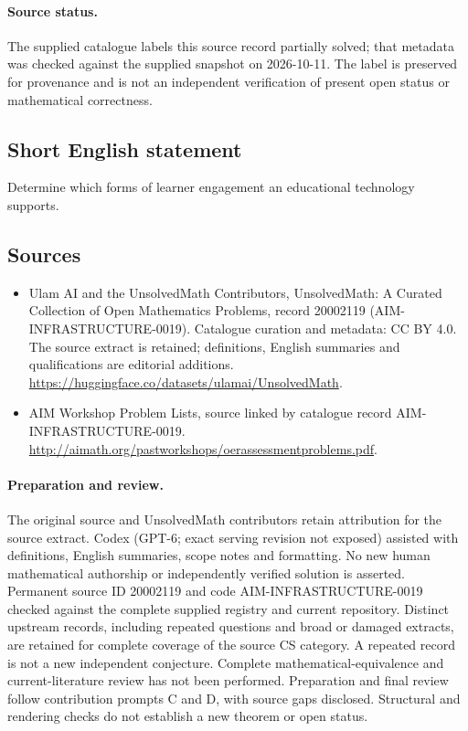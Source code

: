 \documentclass[11pt]{article}
\begin{document}
\paragraph{Source status.}
The supplied catalogue labels this source record partially solved; that metadata was checked against the supplied snapshot on 2026-10-11. The label is preserved for provenance and is not an independent verification of present open status or mathematical correctness.
\subsection{Short English statement}
Determine which forms of learner engagement an educational technology supports.
\subsection{Sources}
\begin{itemize}
\item[\hypertarget{source:20002119:1}{S1}] Ulam AI and the UnsolvedMath Contributors, UnsolvedMath: A Curated Collection of Open Mathematics Problems, record 20002119 (AIM-INFRASTRUCTURE-0019). Catalogue curation and metadata: CC BY 4.0. The source extract is retained; definitions, English summaries and qualifications are editorial additions.
\url{https://huggingface.co/datasets/ulamai/UnsolvedMath}.
\item[\hypertarget{source:20002119:2}{S2}] AIM Workshop Problem Lists, source linked by catalogue record AIM-INFRASTRUCTURE-0019.
\url{http://aimath.org/pastworkshops/oerassessmentproblems.pdf}.
\end{itemize}
\paragraph{Preparation and review.}
The original source and UnsolvedMath contributors retain attribution for the source extract. Codex (GPT-6; exact serving revision not exposed) assisted with definitions, English summaries, scope notes and formatting. No new human mathematical authorship or independently verified solution is asserted. Permanent source ID 20002119 and code AIM-INFRASTRUCTURE-0019 checked against the complete supplied registry and current repository. Distinct upstream records, including repeated questions and broad or damaged extracts, are retained for complete coverage of the source CS category. A repeated record is not a new independent conjecture. Complete mathematical-equivalence and current-literature review has not been performed. Preparation and final review follow contribution prompts C and D, with source gaps disclosed. Structural and rendering checks do not establish a new theorem or open status.
\label{end:20002119}
\end{document}
